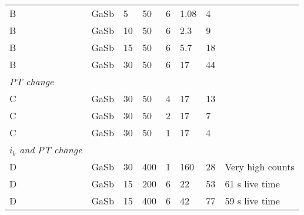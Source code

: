 \begin{table}[phtb]
\begin{center}
\begin{tabular}{lllllllp{3.5cm}}
            B                          & GaSb            & 5              & 50             & 6           & 1.08         & 4           &                     \\
            B                          & GaSb            & 10             & 50             & 6           & 2.3          & 9           &                     \\
            B                          & GaSb            & 15             & 50             & 6           & 5.7          & 18          &                     \\
            B                          & GaSb            & 30             & 50             & 6           & 17           & 44          &                     \\
            \hline
            \emph{PT change}           &                 &                &                &             &              &             &                     \\
            C                          & GaSb            & 30             & 50             & 4           & 17           & 13          &                     \\
            C                          & GaSb            & 30             & 50             & 2           & 17           & 7           &                     \\
            C                          & GaSb            & 30             & 50             & 1           & 17           & 4           &                     \\
            \hline
            \emph{$i_b$ and PT change} &                 &                &                &             &              &             &                     \\
            D                          & GaSb            & 30             & 400            & 1           & 160          & 28          & Very high counts    \\
            D                          & GaSb            & 15             & 200            & 6           & 22           & 53          & 61 s live time      \\
            D                          & GaSb            & 15             & 400            & 6           & 42           & 77          & 59 s live time      \\

\end{tabular}
\end{center}
\end{table}
